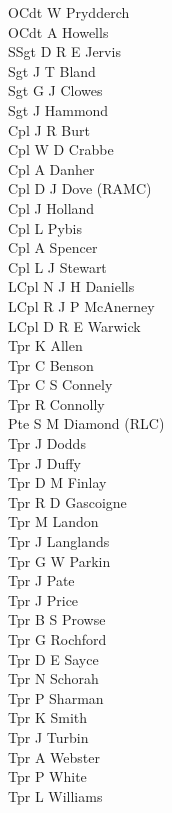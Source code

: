 \begin{multicols}{3}
  \small
  \noindent
  OCdt W Prydderch \\
  OCdt A Howells \\
  SSgt D R E Jervis \\
  Sgt J T Bland \\
  Sgt G J Clowes \\
  Sgt J Hammond \\
  Cpl J R Burt \\
  Cpl W D Crabbe \\
  Cpl A Danher \\
  Cpl D J Dove (RAMC) \\
  Cpl J Holland \\
  Cpl L Pybis \\
  Cpl A Spencer \\
  Cpl L J Stewart \\
  LCpl N J H Daniells \\
  LCpl R J P McAnerney \\
  LCpl D R E Warwick \\
  Tpr K Allen \\
  Tpr C Benson \\
  Tpr C S Connely \\
  Tpr R Connolly \\
  Pte S M Diamond (RLC) \\
  Tpr J Dodds \\
  Tpr J Duffy \\
  Tpr D M Finlay \\
  Tpr R D Gascoigne \\
  Tpr M Landon \\
  Tpr J Langlands \\
  Tpr G W Parkin \\
  Tpr J Pate \\
  Tpr J Price \\
  Tpr B S Prowse \\
  Tpr G Rochford \\
  Tpr D E Sayce \\
  Tpr N Schorah \\
  Tpr P Sharman \\
  Tpr K Smith \\
  Tpr J Turbin \\
  Tpr A Webster \\
  Tpr P White \\
  Tpr L Williams \\
\end{multicols}

